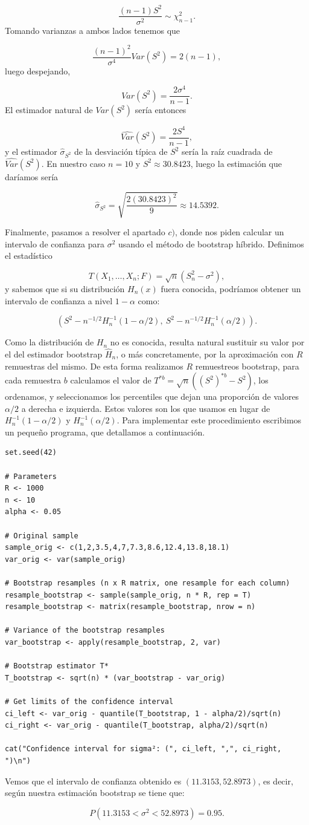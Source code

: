 \documentclass[12pt]{article}
\begin{document}
\[
\frac{(n-1)S^2}{\sigma^2} \sim \chi^2_{n-1}.
\]
Tomando varianzas a ambos lados tenemos que

\[
\frac{(n-1)^2}{\sigma^4}Var(S^2)=2(n-1),
\]
luego despejando,

\[
Var(S^2)=\frac{2\sigma^4}{n-1}.
\]
El estimador natural de $Var(S^2)$ sería entonces

\[
\widehat{Var}(S^2)=\frac{2S^4}{n-1},
\]
y el estimador $\hat\sigma_{S^2}$ de la desviación típica de $S^2$ sería la raíz cuadrada de $\widehat{Var}(S^2)$. En nuestro caso $n=10$ y $S^2\approx 30.8423$, luego la estimación que daríamos sería

\[
\hat\sigma_{S^2}=\sqrt{\frac{2(30.8423)^2}{9}} \approx 14.5392.
\]

Finalmente, pasamos a resolver el apartado $c)$, donde nos piden calcular un intervalo de confianza para $\sigma^2$ usando el método de bootstrap híbrido. Definimos el estadístico

\[
T(X_1,\dots,X_n; F)=\sqrt{n}(S_n^2 - \sigma^2),
\]
y sabemos que si su distribución $H_n(x)$ fuera conocida, podríamos obtener un intervalo de confianza a nivel $1-\alpha$ como:

\[
(S^2 - n^{-1/2}H_n^{-1}(1-\alpha/2), \ S^2 - n^{-1/2}H_n^{-1}(\alpha/2)).
\]

Como la distribución de $H_n$ no es conocida, resulta natural sustituir su valor por el del estimador bootstrap $\hat H_n$, o más concretamente, por la aproximación con $R$ remuestras del mismo. De esta forma realizamos $R$ remuestreos bootstrap, para cada remuestra $b$ calculamos el valor de $T^{*b}=\sqrt{n}((S^2)^{*b} - S^2)$, los ordenamos, y seleccionamos los percentiles que dejan una proporción de valores $\alpha/2$ a derecha e izquierda. Estos valores son los que usamos en lugar de $H_n^{-1}(1-\alpha/2)$ y $H_n^{-1}(\alpha/2)$. Para implementar este procedimiento escribimos un pequeño programa, que detallamos a continuación.

\begin{verbatim}
set.seed(42)

# Parameters
R <- 1000
n <- 10
alpha <- 0.05

# Original sample
sample_orig <- c(1,2,3.5,4,7,7.3,8.6,12.4,13.8,18.1)
var_orig <- var(sample_orig)

# Bootstrap resamples (n x R matrix, one resample for each column)
resample_bootstrap <- sample(sample_orig, n * R, rep = T)
resample_bootstrap <- matrix(resample_bootstrap, nrow = n)

# Variance of the bootstrap resamples
var_bootstrap <- apply(resample_bootstrap, 2, var)

# Bootstrap estimator T*
T_bootstrap <- sqrt(n) * (var_bootstrap - var_orig)

# Get limits of the confidence interval
ci_left <- var_orig - quantile(T_bootstrap, 1 - alpha/2)/sqrt(n)
ci_right <- var_orig - quantile(T_bootstrap, alpha/2)/sqrt(n)

cat("Confidence interval for sigma²: (", ci_left, ",", ci_right, ")\n")
\end{verbatim}

Vemos que el intervalo de confianza obtenido es $(11.3153, 52.8973)$, es decir, según nuestra estimación bootstrap se tiene que:

\[
P(11.3153 < \sigma^2 < 52.8973) = 0.95.
\]
\end{document}
